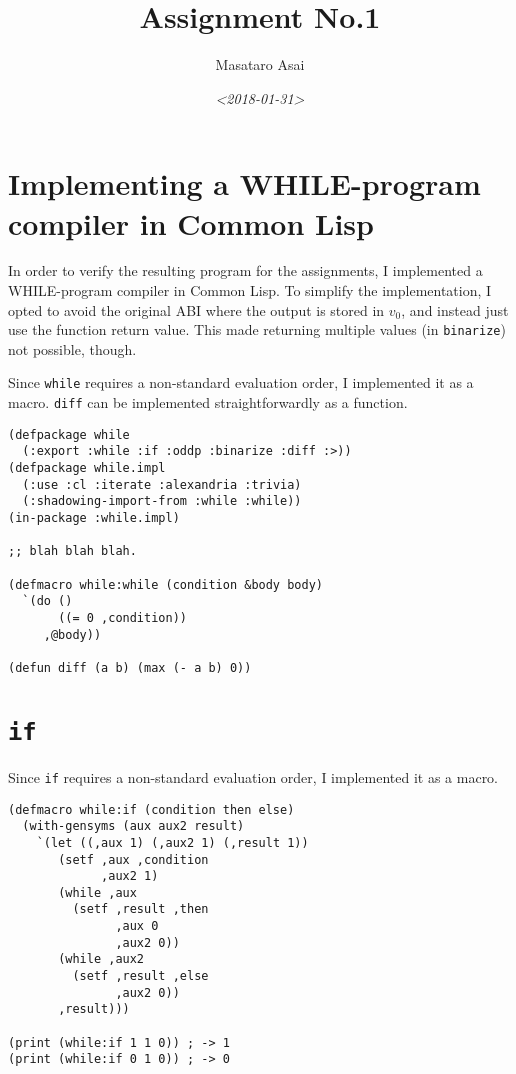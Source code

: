 \documentclass{article}
\author{Masataro Asai}
\date{\textit{<2018-01-31>} }
\title{Assignment No.1}
\begin{document}
\maketitle

\section{Implementing a WHILE-program compiler in Common Lisp}
\label{sec:orgbfa9313}

In order to verify the resulting program for the assignments, I implemented a
WHILE-program compiler in Common Lisp.  To simplify the implementation, I opted
to avoid the original ABI where the output is stored in $v_0$, and instead just
use the function return value. This made returning multiple
values (in \texttt{binarize}) not possible, though.

Since \texttt{while} requires a non-standard evaluation order, I implemented it as a macro.
\texttt{diff} can be implemented straightforwardly as a function.

\lstset{language=Lisp,label= ,caption= ,captionpos=b,numbers=none}
\begin{lstlisting}
(defpackage while
  (:export :while :if :oddp :binarize :diff :>))
(defpackage while.impl
  (:use :cl :iterate :alexandria :trivia)
  (:shadowing-import-from :while :while))
(in-package :while.impl)

;; blah blah blah.

(defmacro while:while (condition &body body)
  `(do ()
       ((= 0 ,condition))
     ,@body))

(defun diff (a b) (max (- a b) 0))
\end{lstlisting}

\section{\texttt{if}}
\label{sec:orgdd60bb7}

Since \texttt{if} requires a non-standard evaluation order, I implemented it as a macro.

\lstset{language=Lisp,label= ,caption= ,captionpos=b,numbers=none}
\begin{lstlisting}
(defmacro while:if (condition then else)
  (with-gensyms (aux aux2 result)
    `(let ((,aux 1) (,aux2 1) (,result 1))
       (setf ,aux ,condition
             ,aux2 1)
       (while ,aux
         (setf ,result ,then
               ,aux 0
               ,aux2 0))
       (while ,aux2
         (setf ,result ,else
               ,aux2 0))
       ,result)))

(print (while:if 1 1 0)) ; -> 1
(print (while:if 0 1 0)) ; -> 0
\end{lstlisting}
\end{document}
